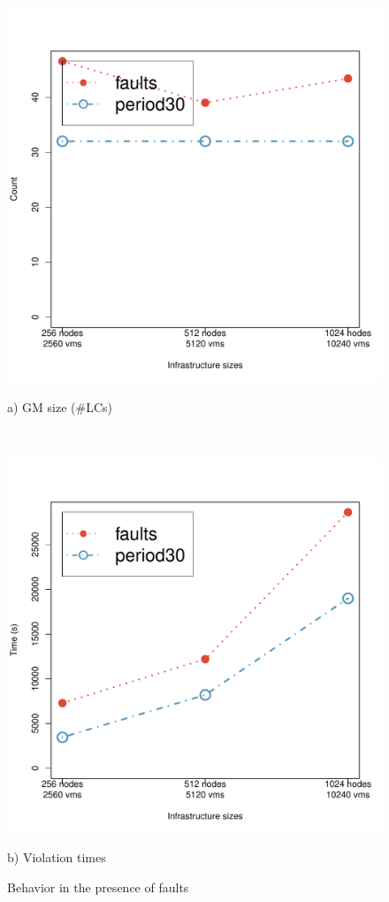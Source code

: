 \begin{figure}
  \parbox{.47\linewidth}{\centering
  \includegraphics[width=.95\linewidth]{figures/snoozeFault-successPsize.pdf}

  a) GM size (\#LCs)
  }
  \
  \parbox{.47\linewidth}{\centering
  \includegraphics[width=.95\linewidth]{figures/snoozeFault-violationTime.pdf}

  b) Violation times
  }
  \caption{Behavior in the presence of faults}
  \label{fig:snoozeFaults}
\end{figure}

